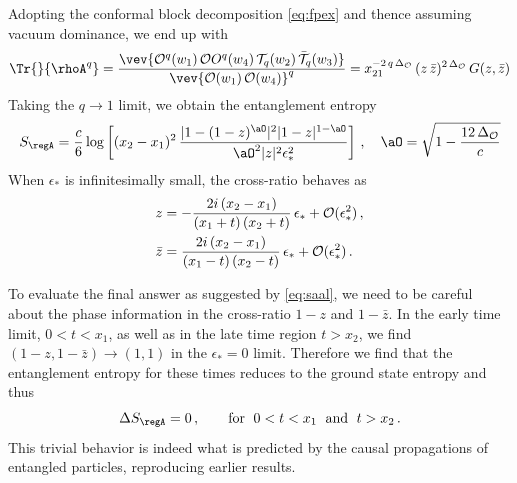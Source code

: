 \documentclass[12pt,openany]{book}
\begin{document}
Adopting the conformal block decomposition \eqref{eq:fpex} and thence assuming vacuum dominance,  we end up with
%
\begin{equation}
\begin{split}
\Tr{}{\rhoA^q} = \frac{
 \vev{{\cal O}^q(w_1)\, {\cal O}O^q(w_4)\, {\cal T}_q(w_2)\, \bar{{\cal T}}_q(w_3)}}
 {\vev{{\cal O}(w_1)\, {\cal O}(w_4)}^q}  =  x_{21}^{-2\, q\, \Delta_{\cal O}} \, (z\,\bar{z})^{2\,\Delta_{\cal O}} \, G(z,{\bar z})
\end{split}
\end{equation}
%
Taking the $q\to 1$ limit, we obtain the entanglement entropy \cite{Asplund:2014coa}
%
\begin{equation}
S_\regA=\frac{c}{6}\log \left[(x_2-x_1)^2\, \frac{|1-(1-z)^{\aO}|^2|1-z|^{1-\aO}}{\aO^2|z|^2\epsilon_*^2}\right] \,, \quad
\aO=\sqrt{1-\frac{12\,\Delta_{\cal O}}{c}}
\label{eq:saal}
\end{equation}
%
When $\epsilon_*$ is infinitesimally small, the cross-ratio behaves as
%
\begin{equation}
\begin{split}
& z=-\frac{2i\,(x_2-x_1)}{(x_1+t)\, (x_2+t)}\, \epsilon_*+ {\cal O}(\epsilon_*^2) \,,\\
& \bar{z}=\frac{2i\,(x_2-x_1)}{(x_1-t)\, (x_2-t)}\,\epsilon_*+{\cal O}(\epsilon_*^2) \,.
\end{split}
\label{}
\end{equation}
%

To evaluate the final answer as suggested by \eqref{eq:saal}, we need to be careful about the phase information in the cross-ratio
$1-z$ and $1-\bar{z}$.
In the early time limit, $0<t<x_1$, as well as in the  late time region $t>x_2$, we find $(1-z,1-\bar{z})\to (1,1)$ in the $\epsilon_*=0$ limit. Therefore we find that the entanglement entropy for these times reduces to the ground state entropy and thus
%
\begin{equation}
\Delta S_\regA= 0 \,, \qquad \text{for}\; \ 0<t<x_1 \;\ \text{and}\;\  t>x_2 \,.
\end{equation}
%
This trivial behavior is indeed what is predicted by the causal propagations of entangled particles, reproducing earlier results.
\end{document}
